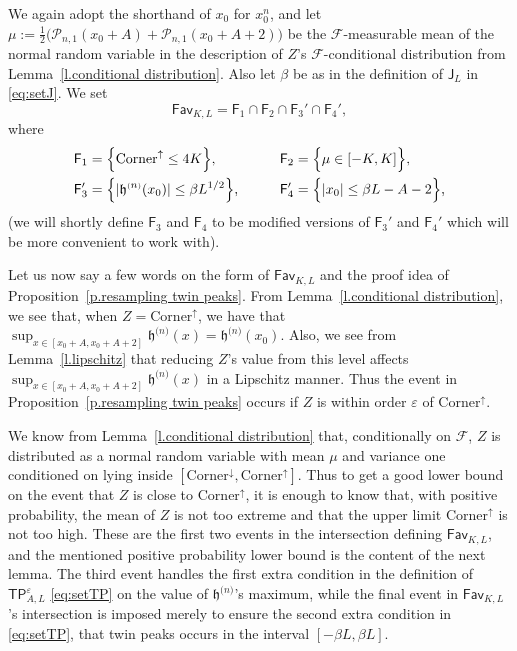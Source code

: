 \documentclass[oneside,final,11pt]{amsart}
\theoremstyle{definition}
\newcommand{\Corner}{\mathrm{Corner}}
\newcommand{\fav}{\mathsf{Fav}}
\renewcommand{\L}{\CP}
\newcommand{\fh}{\mathfrak{h}}
\newcommand{\h}{\fh^{{\scriptscriptstyle(}n{\scriptscriptstyle)}}}
\newcommand{\TP}[1]{\mathsf{TP}_{\!\!#1}}
\newcommand{\bJ}{\mathsf{J}}
\newcommand{\1}[1]{\mathbf{1}_{#1}}
\newcommand{\eps}{\varepsilon}
\newcommand{\F}{\mathscr{F}}
\newcommand{\msf}{\mathsf}
\newcommand{\CP}{\mathcal{P}}
\numberwithin{equation}{section}
\begin{document}
We again adopt the shorthand of $x_0$ for $x_0^{n}$, and let $\mu := \frac{1}{2}\bigl(\L_{n,1}(x_0+ A) + \L_{n,1}(x_0+A+2)\bigr)$ be the $\F$-measurable mean of the normal random variable in the description of $Z$'s $\F$-conditional distribution from Lemma~\ref{l.conditional distribution}. Also let $\beta$ be as in the definition of $\bJ_L$ in \eqref{eq:setJ}. We set
%
$$\fav_{K,L} = \msf F_1 \cap \msf F_2 \cap \msf F_3' \cap \msf F_4',$$
%
where
%
\begin{align*}
\msf F_1 &= \Big\{\Corner^{\uparrow} \leq 4K\Big\}, \qquad &\msf F_2 &= \Big\{\mu \in [-K, K] \Big\},\\
%
\msf F_3' &= \Bigl\{|\h(x_0)| \leq \beta L^{1/2}\Bigr\}, \qquad &\msf F_4' &= \Big\{|x_0|\leq \beta L-A-2\Big\},
\end{align*}
%
(we will shortly define $\msf F_3$ and $\msf F_4$ to be modified versions of $\msf F_3'$ and $\msf F_4'$ which will be more convenient to work with).

Let us now say a few words on the form of $\fav_{K,L}$ and the proof idea of Proposition~\ref{p.resampling twin peaks}. From Lemma~\ref{l.conditional distribution}, we see that, when $Z = \Corner^{\uparrow}$, we have that $\sup_{x\in [x_0+A,x_0+A+2]} \h(x) = \h(x_0)$. Also, we see from Lemma~\ref{l.lipschitz} that reducing $Z$'s value from this level affects $\sup_{x\in [x_0+A,x_0+A+2]} \h(x)$ in a Lipschitz manner. Thus the event in Proposition~\ref{p.resampling twin peaks} occurs if $Z$ is within order $\varepsilon$ of $\Corner^{\uparrow}$.

We know from Lemma~\ref{l.conditional distribution} that, conditionally on $\F$, $Z$ is distributed as a normal random variable with mean $\mu$ and variance one conditioned on lying inside $[\Corner^{\downarrow}, \Corner^{\uparrow}]$. Thus to get a good lower bound on the event that $Z$ is close to $\Corner^{\uparrow}$, it is enough to know that, with positive probability, the mean of $Z$ is not too extreme and that the upper limit $\Corner^{\uparrow}$ is not too high. These are the first two events in the intersection defining $\fav_{K,L}$, and the mentioned positive probability lower bound is the content of the next lemma. The third event  handles the first extra condition in the definition of $\TP{A,L}^\eps$ \eqref{eq:setTP} on the value of $\h$'s maximum, while the final event in $\fav_{K,L}$'s intersection is imposed merely to ensure the second extra condition in \eqref{eq:setTP}, that twin peaks occurs in the interval $[-\beta L, \beta L]$.
\end{document}
